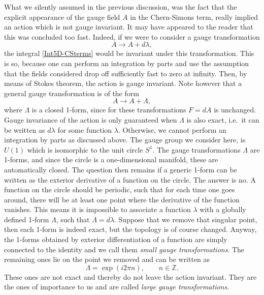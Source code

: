 \documentclass[12pt,twoside]{book}
\begin{document}
What we silently assumed in the previous discussion, was the fact that the explicit appearance of the gauge field $A$ in the Chern-Simons term, really implied an action which is not gauge invariant. It may have appeared to the reader that this was concluded too fast. Indeed, if we were to consider a gauge transformation
\begin{equation}
A \rightarrow A + d\lambda,
\end{equation}
the integral \eqref{Int5D-CSterms} would be invariant under this transformation. This is so, because one can perform an integration by parts and use the assumption that the fields considered drop off sufficiently fast to zero at infinity. Then, by means of Stokes theorem, the action is gauge invariant. Note however that a general gauge transformation is of the form
\begin{equation}
A \rightarrow A + \Lambda,
\end{equation}
where $\Lambda$ is a closed 1-form, since for these transformations $F = dA$ is unchanged. Gauge invariance of the action is only guaranteed when $\Lambda$ is also exact, i.e.\ it can be written as $d\lambda$ for some function $\lambda$. Otherwise, we cannot perform an integration by parts as discussed above. The gauge group we consider here, is $U(1)$ which is isomorphic to the unit circle $S^{1}$. The gauge transformations $\Lambda$ are 1-forms, and since the circle is a one-dimensional manifold, these are automatically closed. The question then remains if a generic 1-form can be written as the exterior derivative of a function on the circle. The answer is no. A function on the circle should be periodic, such that for each time one goes around, there will be at least one point where the derivative of the function vanishes. This means it is impossible to associate a function $\lambda$ with a globally defined 1-form $\Lambda$, such that $\Lambda = d\lambda$. Suppose that we remove that singular point, then each 1-form is indeed exact, but the topology is of course changed. Anyway, the 1-forms obtained by exterior differentiation of a function are simply connected to the identity and we call them \emph{small gauge transformations}. The remaining ones lie on the point we removed and can be written as
\begin{equation}
\Lambda = \exp(i 2\pi n), \qquad n\in\mathbb{Z}.
\end{equation}
These ones are not exact and thereby do not leave the action invariant. They are the ones of importance to us and are called \emph{large gauge transformations}.
\end{document}
